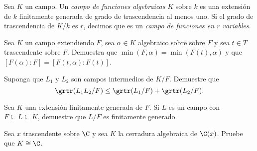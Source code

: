 \begin{definition}
  Sea $K$ un campo. Un \emph{campo de funciones algebraicas} $K$ sobre $k$ es una extensión de $k$ finitamente generada de grado de trascendencia al menos uno. Si el grado de trascendencia de $K/k$ es $r$, decimos que es un \emph{campo de funciones en $r$ variables}.
\end{definition}





\ExerciseSection

\begin{exerciseList}
  \item Sea $K$ un campo extendiendo $F$, sea $\alpha \in K$ algebraico sobre sobre $F$ y sea $t \in T$ trascendente sobre $F$. Demuestra que $\min(F, \alpha) = \min(F(t), \alpha)$ y que $[F(\alpha) : F] = [F(t, \alpha) : F(t)]$.
  
  \item Suponga que $L_1$ y $L_2$ son campos intermedios de $K/F$. Demuestre que
  \[
    \grtr(L_1L_2/F) \leq \grtr(L_1/F) + \grtr(L_2/F).
  \]

  \item Sea $K$ una extensión finitamente generada de $F$. Si $L$ es un campo con $F \subseteq L \subseteq K$, demuestre que $L/F$ es finitamente generado.
  
  \item Sea $x$ trascendente sobre $\C$ y sea $K$ la cerradura algebraica de $\C(x)$. Pruebe que $K \cong \C$.
\end{exerciseList}